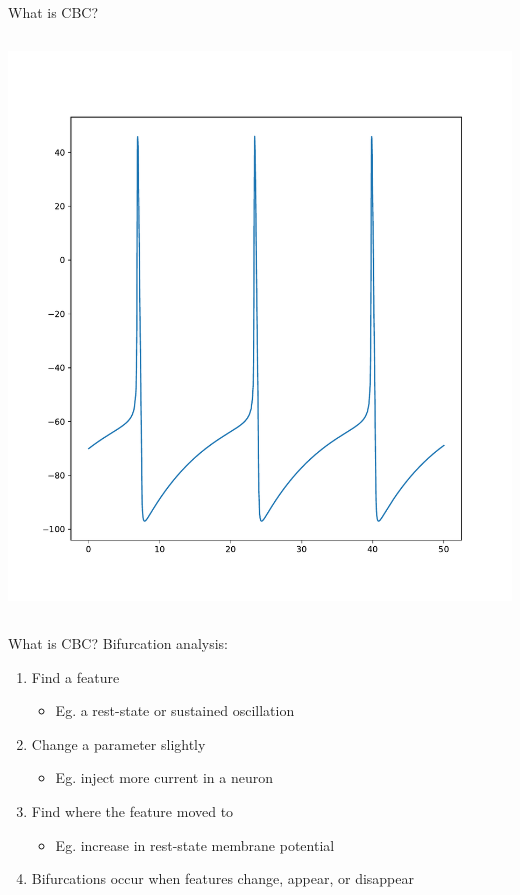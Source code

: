 \documentclass[presentation]{beamer}
\begin{document}
\begin{frame}[label={sec:org273aa8e}]{What is CBC?}
\begin{columns}
\begin{column}{0.5\columnwidth}
\begin{center}
\includegraphics[height=.8\textheight]{./spiking.pdf}
\end{center}
\end{column}
\end{columns}
\end{frame}

\begin{frame}[label={sec:org7746c9d}]{What is CBC?}
Bifurcation analysis:
\begin{enumerate}[<+->]
\item Find a feature
\begin{itemize}
\item Eg. a rest-state or sustained oscillation
\end{itemize}
\item Change a parameter slightly
\begin{itemize}
\item Eg. inject more current in a neuron
\end{itemize}
\item Find where the feature moved to
\begin{itemize}
\item Eg. increase in rest-state membrane potential
\end{itemize}
\item Bifurcations occur when features change, appear, or disappear
\end{enumerate}
\end{frame}
\end{document}
